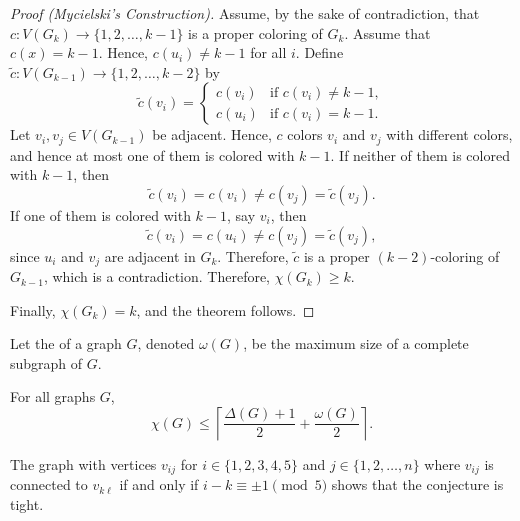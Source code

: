 \begin{proof}[Proof (Mycielski's Construction)]
    Assume, by the sake of contradiction, that
    \(c \colon V(G_k) \to \{1, 2, \ldots, k-1\}\)
    is a proper coloring of \(G_k\).
    Assume that \(c(x) = k-1\).
    Hence, \(c(u_i) \neq k-1\) for all \(i\).
    Define \(\tilde{c} \colon V(G_{k-1}) \to \{1, 2, \ldots, k-2\}\) by
    \begin{equation}
        \tilde{c}(v_i) =
        \begin{cases}
            c(v_i) & \text{if } c(v_i) \neq k-1, \\
            c(u_i) & \text{if } c(v_i) = k-1.
        \end{cases}
    \end{equation}
    Let \(v_i, v_j \in V(G_{k-1})\) be adjacent.
    Hence, \(c\) colors \(v_i\) and \(v_j\) with different colors, and hence at most one of them is colored with \(k-1\).
    If neither of them is colored with \(k-1\), then
    \begin{equation}
        \tilde{c}(v_i) = c(v_i) \neq c(v_j) = \tilde{c}(v_j).
    \end{equation}
    If one of them is colored with \(k-1\), say \(v_i\), then
    \begin{equation}
        \tilde{c}(v_i) = c(u_i) \neq c(v_j) = \tilde{c}(v_j),
    \end{equation}
    since \(u_i\) and \(v_j\) are adjacent in \(G_k\).
    Therefore, \(\tilde{c}\) is a proper \((k-2)\)-coloring of \(G_{k-1}\), which is a contradiction.
    Therefore, \(\chi(G_k) \geq k\).

    Finally, \(\chi(G_k) = k\), and the theorem follows.
\end{proof}

Let the  of a graph \(G\), denoted \(\omega(G)\), be the maximum size of a complete subgraph of \(G\).

\begin{conjecture}[Reed]
    For all graphs \(G\),
    \begin{equation}
        \chi(G) \leq \left\lceil \frac{\Delta(G)+1}{2} + \frac{\omega(G)}{2} \right\rceil.
    \end{equation}
\end{conjecture}

The graph with vertices \(v_{ij}\) for \(i \in \{1, 2, 3, 4, 5\}\) and \(j \in \{1, 2, \dots, n\}\) where \(v_{ij}\) is connected to \(v_{k\ell}\) if and only if \(i-k \equiv \pm 1 \pmod{5}\) shows that the conjecture is tight.

